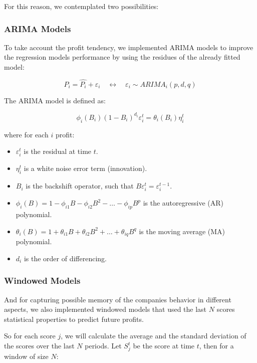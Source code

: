 \documentclass[11pt,english,a4paper,hidelinks]{book}
\begin{document}
\vspace{0.5cm}
\noindent For this reason, we contemplated two possibilities:

\subsubsection{ARIMA Models}
To take account the profit tendency, we implemented ARIMA models to improve the regression models performance by using the residues of the already fitted model:

\begin{equation}
    P_i = \hat{P_i} + {\varepsilon_i} \quad \longleftrightarrow \quad {\varepsilon_i} \sim ARIMA_i(p,d,q)
\end{equation}

\noindent The ARIMA model is defined as:

\begin{equation}
    \phi_i(B_i)(1 - B_i)^{d_i} \varepsilon_i^t = \theta_i(B_i) \eta_i^t
    \end{equation}
    
    \noindent where for each $i$ profit:
    \begin{itemize}
      \item \(\varepsilon_i^t\) is the residual at time \(t\).
      \item \(\eta_i^t\) is a white noise error term (innovation).
      \item \(B_i\) is the backshift operator, such that \(B \varepsilon_i^t = \varepsilon_i^{t-1}\).
      \item \(\phi_i(B) = 1 - \phi_{i1} B - \phi_{i2} B^2 - \dots - \phi_{ip} B^p\) is the autoregressive (AR) polynomial.
      \item \(\theta_i(B) = 1 + \theta_{i1} B + \theta_{i2} B^2 + \dots + \theta_{iq} B^q\) is the moving average (MA) polynomial.
      \item \(d_i\) is the order of differencing.
    \end{itemize}
    


\subsubsection{Windowed Models}
And for capturing possible memory of the companies behavior in different aspects, we also implemented windowed models that used the last \(N\) scores statistical properties to predict future profits.

\vspace{0.5cm}
\noindent So for each score \(j\), we will calculate the average and the standard deviation of the scores over the last \(N\) periods. Let \(S_j^t\) be the score at time \(t\), then for a window of size \(N\):
\end{document}
